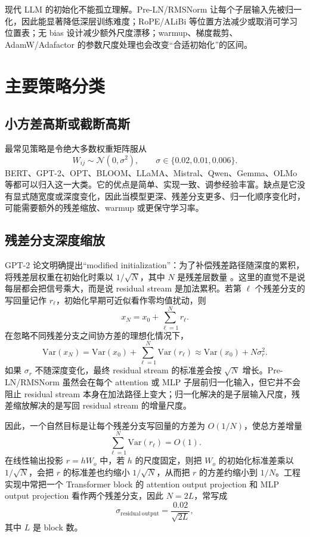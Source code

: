 \documentclass[UTF8,a4paper,11pt]{ctexart}
\newcommand{\Normal}{\mathcal{N}}
\begin{document}
现代 LLM 的初始化不能孤立理解。Pre-LN/RMSNorm 让每个子层输入先被归一化，因此能显著降低深层训练难度；RoPE/ALiBi 等位置方法减少或取消可学习位置表；无 bias 设计减少额外尺度漂移；warmup、梯度裁剪、AdamW/Adafactor 的参数尺度处理也会改变“合适初始化”的区间。

\section{主要策略分类}

\subsection{小方差高斯或截断高斯}

最常见策略是令绝大多数权重矩阵服从
\[
  W_{ij}\sim \Normal(0,\sigma^2),\qquad \sigma\in\{0.02, 0.01, 0.006\}.
\]
BERT、GPT-2、OPT、BLOOM、LLaMA、Mistral、Qwen、Gemma、OLMo 等都可以归入这一大类。它的优点是简单、实现一致、调参经验丰富。缺点是它没有显式随宽度或深度变化，因此当模型更深、残差分支更多、归一化顺序变化时，可能需要额外的残差缩放、warmup 或更保守学习率。

\subsection{残差分支深度缩放}

GPT-2 论文明确提出“modified initialization”：为了补偿残差路径随深度的累积，将残差层权重在初始化时乘以 $1/\sqrt{N}$，其中 $N$ 是残差层数量 \cite{gpt2paper}。这里的直觉不是说每层都会把信号乘大，而是说 residual stream 是加法累积。若第 $\ell$ 个残差分支的写回量记作 $r_\ell$，初始化早期可近似看作零均值扰动，则
\[
  x_{N}=x_0+\sum_{\ell=1}^{N}r_\ell .
\]
在忽略不同残差分支之间协方差的理想化情况下，
\[
  \mathrm{Var}(x_N)
  =\mathrm{Var}(x_0)+\sum_{\ell=1}^{N}\mathrm{Var}(r_\ell)
  \approx \mathrm{Var}(x_0)+N\sigma_r^2 .
\]
如果 $\sigma_r$ 不随深度变化，最终 residual stream 的标准差会按 $\sqrt{N}$ 增长。Pre-LN/RMSNorm 虽然会在每个 attention 或 MLP 子层前归一化输入，但它并不会阻止 residual stream 本身在加法路径上变大；归一化解决的是子层输入尺度，残差缩放解决的是写回 residual stream 的增量尺度。

因此，一个自然目标是让每个残差分支写回量的方差为 $O(1/N)$，使总方差增量
\[
  \sum_{\ell=1}^{N}\mathrm{Var}(r_\ell)=O(1).
\]
在线性输出投影 $r=hW_o$ 中，若 $h$ 的尺度固定，则把 $W_o$ 的初始化标准差乘以 $1/\sqrt{N}$，会把 $r$ 的标准差也约缩小 $1/\sqrt{N}$，从而把 $r$ 的方差约缩小到 $1/N$。工程实现中常把一个 Transformer block 的 attention output projection 和 MLP output projection 看作两个残差分支，因此 $N=2L$，常写成
\[
  \sigma_{\mathrm{residual\ output}}=\frac{0.02}{\sqrt{2L}},
\]
其中 $L$ 是 block 数。
\end{document}
